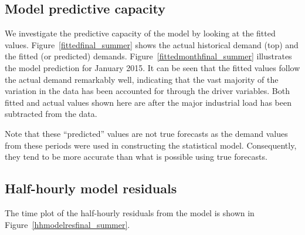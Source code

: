 \documentclass[11pt]{article}
\begin{document}
\subsection{Model predictive capacity}

We investigate the predictive capacity of the model by looking at the fitted values. Figure~\ref{fittedfinal_summer} shows the actual historical demand (top) and the fitted (or predicted) demands. Figure~\ref{fittedmonthfinal_summer} illustrates the model prediction for January 2015. It can be seen that the fitted values follow the actual demand remarkably well, indicating that the vast majority of the variation in the data has been accounted for through the driver variables. Both fitted and actual values shown here are after the major industrial load has been subtracted from the data.




Note that these ``predicted'' values are not true forecasts as the demand values from these periods were used in constructing the statistical model. Consequently, they tend to be more accurate than what is possible using true forecasts.


\subsection{Half-hourly model residuals}



The time plot of the half-hourly residuals from the model is shown in Figure~\ref{hhmodelresfinal_summer}.
\end{document}
